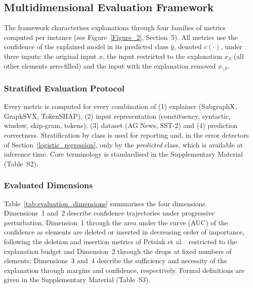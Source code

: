 \documentclass[preprint, times, review, 10pt]{elsarticle}
\begin{document}
\subsection{Multidimensional Evaluation Framework} \label{sec:evaluation_framework}

The framework characterises explanations through four families of metrics computed per instance (see Figure~\ref{Figure_2}, Section~5). All metrics use the confidence of the explained model in its predicted class \(\hat{y}\), denoted \(c(\cdot)\), under three inputs: the original input \(x\), the input restricted to the explanation \(x_{S}\) (all other elements zero-filled) and the input with the explanation removed \(x_{\setminus S}\).

\subsubsection{Stratified Evaluation Protocol}

Every metric is computed for every combination of (1) explainer (SubgraphX, GraphSVX, TokenSHAP), (2) input representation (constituency, syntactic, window, skip-gram, tokens), (3) dataset (AG News, SST-2) and (4) prediction correctness. Stratification by class is used for reporting and, in the error detectors of Section~\ref{logistic_regression}, only by the \emph{predicted} class, which is available at inference time. Core terminology is standardised in the Supplementary Material (Table~S2).

\subsubsection{Evaluated Dimensions}

Table~\ref{tab:evaluation_dimensions} summarises the four dimensions. Dimensions~1 and~2 describe confidence trajectories under progressive perturbation, Dimension~1 through the area under the curve (AUC) of the confidence as elements are deleted or inserted in decreasing order of importance, following the deletion and insertion metrics of Petsiuk et al.~\cite{petsiuk2018rise} restricted to the explanation budget and Dimension~2 through the drops at fixed numbers of elements; Dimensions~3 and~4 describe the sufficiency and necessity of the explanation through margins and confidence, respectively. Formal definitions are given in the Supplementary Material (Table~S3).
\end{document}
